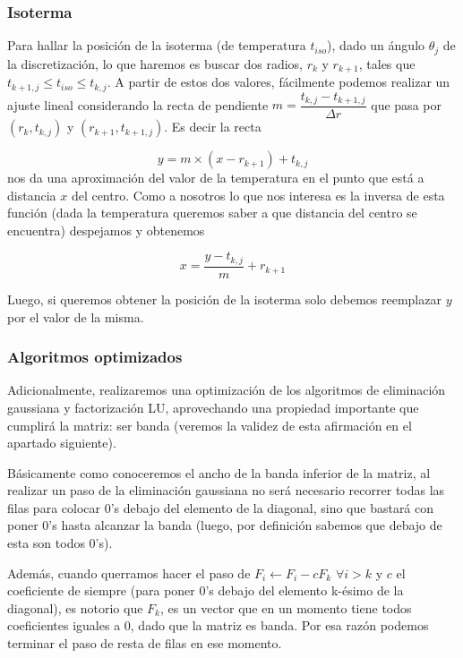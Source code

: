 \subsubsection{Isoterma}

Para hallar la posición de la isoterma (de temperatura $t_{iso}$), dado un ángulo $\theta_j$ de la discretización, lo que haremos es buscar dos radios, $r_k$ y $r_{k+1}$, tales que $t_{k+1,j} \leq t_{iso} \leq t_{k, j}$. A partir de estos dos valores, fácilmente podemos realizar un ajuste lineal considerando la recta de pendiente $m = \dfrac{t_{k,j}-t_{k+1,j}}{\Delta r}$ que pasa por $(r_k,t_{k,j})$ y $(r_{k+1}, t_{k+1,j})$. Es decir la recta

\begin{equation*}
y = m \times (x - r_{k+1}) + t_{k,j}
\end{equation*}
nos da una aproximación del valor de la temperatura en el punto que está a distancia $x$ del centro. Como a nosotros lo que nos interesa es la inversa de esta función (dada la temperatura queremos saber a que distancia del centro se encuentra) despejamos y obtenemos 


\begin{equation}
x = \dfrac{ y-t_{k,j} } {m} + r_{k+1}
\end{equation}

Luego, si queremos obtener la posición de la isoterma solo debemos reemplazar $y$ por el valor de la misma.

\subsubsection{Algoritmos optimizados}

Adicionalmente, realizaremos una optimización de los algoritmos de eliminación gaussiana y factorización LU, aprovechando una propiedad importante que cumplirá la matriz: ser banda (veremos la validez de esta afirmación en el apartado siguiente).

Básicamente como conoceremos el ancho de la banda inferior de la matriz, al realizar un paso de la eliminación gaussiana no será necesario recorrer todas las filas para colocar 0's debajo del elemento de la diagonal, sino que bastará con poner 0's hasta alcanzar la banda (luego, por definición sabemos que debajo de esta son todos 0's).

Además, cuando querramos hacer el paso de $F_i \leftarrow F_i - cF_k$ $\forall i>k$ y $c$ el coeficiente de siempre (para poner 0's debajo del elemento k-ésimo de la diagonal), es notorio que $F_k$, es un vector que en un momento tiene todos coeficientes iguales a 0, dado que la matriz es banda. Por esa razón podemos terminar el paso de resta de filas en ese momento.

